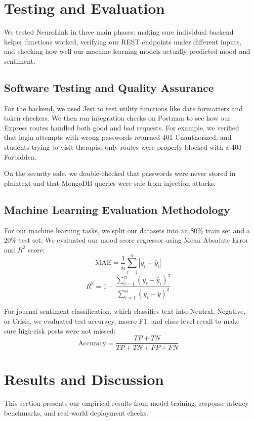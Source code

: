 \documentclass[a4paper,11pt]{report}
\begin{document}
\section{Testing and Evaluation}
We tested NeuroLink in three main phases: making sure individual backend helper functions worked, verifying our REST endpoints under different inputs, and checking how well our machine learning models actually predicted mood and sentiment.

\subsection{Software Testing and Quality Assurance}
For the backend, we used Jest to test utility functions like date formatters and token checkers. We then ran integration checks on Postman to see how our Express routes handled both good and bad requests. For example, we verified that login attempts with wrong passwords returned 401 Unauthorized, and students trying to visit therapist-only routes were properly blocked with a 403 Forbidden.

On the security side, we double-checked that passwords were never stored in plaintext and that MongoDB queries were safe from injection attacks.

\subsection{Machine Learning Evaluation Methodology}
For our machine learning tasks, we split our datasets into an 80\% train set and a 20\% test set. We evaluated our mood score regressor using Mean Absolute Error and $R^2$ score:
\begin{equation}
    \text{MAE} = \frac{1}{n} \sum_{i=1}^{n} |y_i - \hat{y}_i|
\end{equation}
\begin{equation}
    R^2 = 1 - \frac{\sum_{i=1}^{n} (y_i - \hat{y}_i)^2}{\sum_{i=1}^{n} (y_i - \bar{y})^2}
\end{equation}

For journal sentiment classification, which classifies text into Neutral, Negative, or Crisis, we evaluated test accuracy, macro F1, and class-level recall to make sure high-risk posts were not missed:
\begin{equation}
    \text{Accuracy} = \frac{TP + TN}{TP + TN + FP + FN}
\end{equation}

\section{Results and Discussion}
This section presents our empirical results from model training, response latency benchmarks, and real-world deployment checks.
\end{document}
